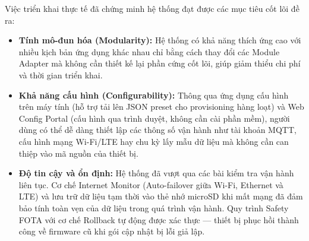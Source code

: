 Việc triển khai thực tế đã chứng minh hệ thống đạt được các mục tiêu cốt lõi đề ra:

\begin{itemize}
    \item \textbf{Tính mô-đun hóa (Modularity):} Hệ thống có khả năng thích ứng cao với nhiều kịch bản ứng dụng khác nhau chỉ bằng cách thay đổi các Module Adapter mà không cần thiết kế lại phần cứng cốt lõi, giúp giảm thiểu chi phí và thời gian triển khai.
    \item \textbf{Khả năng cấu hình (Configurability):} Thông qua ứng dụng cấu hình trên máy tính (hỗ trợ tải lên JSON preset cho provisioning hàng loạt) và Web Config Portal (cấu hình qua trình duyệt, không cần cài phần mềm), người dùng có thể dễ dàng thiết lập các thông số vận hành như tài khoản MQTT, cấu hình mạng Wi-Fi/LTE hay chu kỳ lấy mẫu dữ liệu mà không cần can thiệp vào mã nguồn của thiết bị.
    \item \textbf{Độ tin cậy và ổn định:} Hệ thống đã vượt qua các bài kiểm tra vận hành liên tục. Cơ chế Internet Monitor (Auto-failover giữa Wi-Fi, Ethernet và LTE) và lưu trữ dữ liệu tạm thời vào thẻ nhớ microSD khi mất mạng đã đảm bảo tính toàn vẹn của dữ liệu trong quá trình vận hành. Quy trình Safety FOTA với cơ chế Rollback tự động được xác thực — thiết bị phục hồi thành công về firmware cũ khi gói cập nhật bị lỗi giả lập.
\end{itemize}